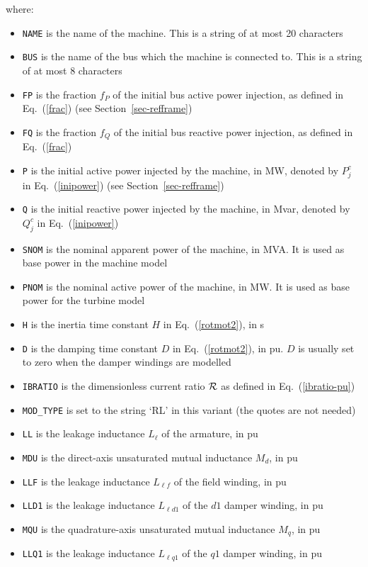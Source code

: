 where:
\begin{itemize}
\item {\tt NAME} is the name of the machine. This is a string of at most 20 characters
\item {\tt BUS} is the name of the bus which the machine is connected to. This is a string of at most 8 characters
\item {\tt FP} is the fraction $f_P$ of the initial bus active power injection, as defined in Eq.~(\ref{frac}) (see Section~\ref{sec-refframe})
\item {\tt FQ} is the fraction $f_Q$ of the initial bus reactive power injection, as defined in Eq.~(\ref{frac})
\item {\tt P} is the initial active power injected by the machine, in MW, denoted by $P^c_j$ in Eq.~(\ref{inipower}) (see Section~\ref{sec-refframe})
\item {\tt Q} is the initial reactive power injected by the machine, in Mvar, denoted by $Q^c_j$ in Eq.~(\ref{inipower})
\item {\tt SNOM} is the nominal apparent power of the machine, in MVA. It is used as base power in the machine model
\item {\tt PNOM} is the nominal active power of the machine, in MW. It is used as base power for the turbine model
\item {\tt H} is the inertia time constant $H$ in Eq.~(\ref{rotmot2}), in s
\item {\tt D} is the damping time constant $D$ in Eq.~(\ref{rotmot2}), in pu. $D$ is usually set to zero when the damper windings are modelled
\item {\tt IBRATIO} is the dimensionless current ratio ${\cal R}$ as defined in Eq.~(\ref{ibratio-pu})
\item {\tt MOD\_TYPE} is set to the string `RL' in this variant (the quotes are not needed)
\item {\tt LL} is the leakage inductance $L_\ell$ of the armature, in pu
\item {\tt MDU} is the direct-axis unsaturated mutual inductance $M_d$, in pu
\item {\tt LLF} is the leakage inductance $L_{\ell f}$ of the field winding, in pu
\item {\tt LLD1} is the leakage inductance $L_{\ell d1}$ of the $d1$ damper winding, in pu
\item {\tt MQU} is the quadrature-axis unsaturated mutual inductance $M_q$, in pu
\item {\tt LLQ1} is the leakage inductance $L_{\ell q1}$ of the $q1$ damper winding, in pu

\end{itemize}
